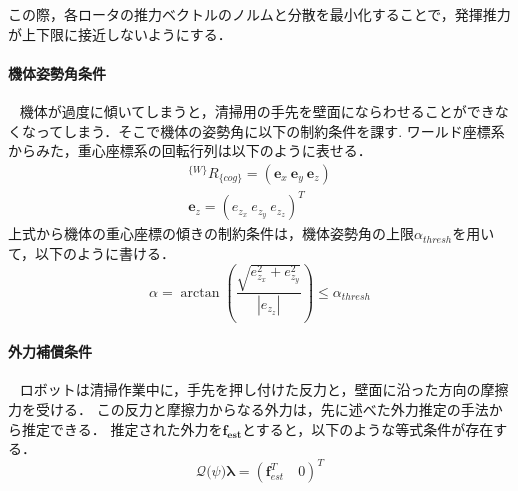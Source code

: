 \documentclass{jarticle}
\begin{document}

この際，各ロータの推力ベクトルのノルムと分散を最小化することで，発揮推力が上下限に接近しないようにする．

\paragraph{機体姿勢角条件}
~ 機体が過度に傾いてしまうと，清掃用の手先を壁面にならわせることができなくなってしまう．そこで機体の姿勢角に以下の制約条件を課す.
ワールド座標系からみた，重心座標系の回転行列は以下のように表せる．
\begin{eqnarray}
    ^{\{W\}}R_{\{cog\}} = \left( \bm{e}_x \ \bm{e}_y \ \bm{e}_z\right) \\
    \bm{e}_z = (e_{z_x} \ e_{z_y} \ e_{z_z})^T
\end{eqnarray}
上式から機体の重心座標の傾きの制約条件は，機体姿勢角の上限$\alpha_{thresh}$を用いて，以下のように書ける．
\begin{equation}
    \label{eq:rot_const}
    \alpha = \arctan\left( \frac{\sqrt{e_{z_x}^2+e_{z_y}^2}}{|e_{z_z}|}\right) \leq \alpha_{thresh}
\end{equation}

\paragraph{外力補償条件}
~ ロボットは清掃作業中に，手先を押し付けた反力と，壁面に沿った方向の摩擦力を受ける．
この反力と摩擦力からなる外力は，先に述べた外力推定の手法から推定できる．
推定された外力を$\bm{f_{est}}$とすると，以下のような等式条件が存在する．
\begin{equation}
    \label{eq:force_comp}
    \mathcal{Q}\bm(\psi)\bm{\lambda} = \left(\bm{f}_{est}^T \quad 0 \right)^T
\end{equation}
\end{document}
